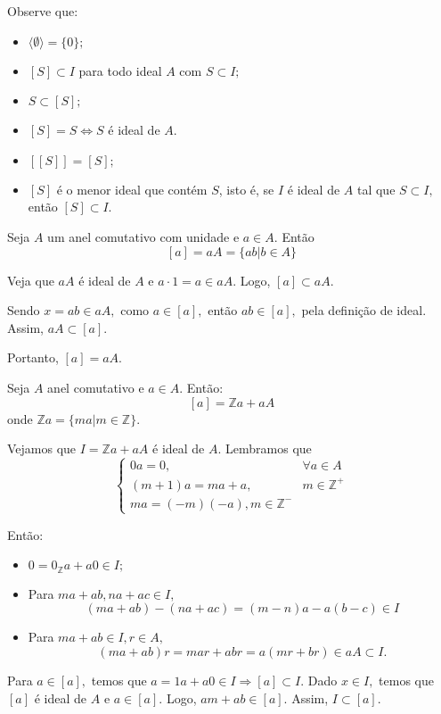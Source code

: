 \documentclass[11pt,twoside,a4paper]{book}
\begin{document}
Observe que:
\begin{itemize}
    \item $\langle \emptyset \rangle = \{ 0 \};$
    \item $[S] \subset I$ para todo ideal $A$ com $S \subset I;$
    \item $S \subset [S];$
    \item $[S] = S \Leftrightarrow S$ é ideal de $A.$
    \item $[[S]] = [S];$
    \item $[S]$ é o menor ideal que contém $S$, isto é, se $I$ é ideal de $A$ tal que $S \subset I,$ então $[S] \subset I.$
\end{itemize}

\begin{exemplo}
Seja $A$ um anel comutativo com unidade e $a \in A.$ Então
\[
[a] = aA = \{ab |b \in A\}
\]

Veja que $aA$ é ideal de $A$ e $a \cdot 1 = a \in aA.$
Logo, $[a] \subset aA.$

Sendo $x = ab \in aA,$ como $a \in [a],$ então $ab \in [a],$ pela definição de ideal. Assim, $aA \subset [a].$

Portanto, $[a] = aA.$
\end{exemplo}

\begin{exemplo}
Seja $A$ anel comutativo e $a \in A.$ Então:
\[
[a] = \mathbb{Z}a + aA
\]
onde $\mathbb{Z}a = \{ma |m \in \mathbb{Z} \}.$

Vejamos que $I = \mathbb{Z}a + aA$ é ideal de $A.$ Lembramos que
\[
\left\{\begin{array}{lc}
0a = 0, & \forall a \in A\\
(m+1)a = ma+a, &m \in \mathbb{Z}^{+} \\
ma = (-m)(-a), m \in \mathbb{Z}^{-}
\end{array}\right.
\]

Então:
\begin{itemize}
    \item $0 = 0_{\mathbb{Z}} a + a 0 \in I;$
    \item Para $ma + ab, na+ac \in I,$
    \[
    (ma+ab)-(na+ac) = (m-n)a - a(b-c) \in I
    \]
    \item Para $ma + ab \in I, r \in A,$
    \[
    (ma + ab)r = mar + abr = a(mr+br) \in aA \subset I.
    \]
\end{itemize}

Para $a \in [a],$ temos que $a = 1a + a0 \in I \Rightarrow [a] \subset I.$
Dado $x \in I,$ temos que $[a]$ é ideal de $A$ e $a \in [a].$ Logo, $am + ab \in [a].$ Assim, $I \subset [a].$
\end{exemplo}
\end{document}
